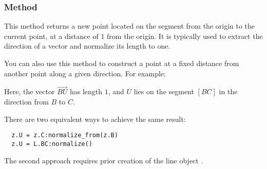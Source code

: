 \vspace{1em}


\begin{tkzexample}[latex = 7cm]
\begin{center}
\end{center}
\end{tkzexample}

\subsubsection{Method }
\label{ssub:method_normalize}

This method returns a new point located on the segment from the origin to the current point, at a distance of $1$ from the origin. It is typically used to extract the direction of a vector and normalize its length to one.

\medskip
\noindent
You can also use this method to construct a point at a fixed distance from another point along a given direction. For example:

\begin{center}
\end{center}

\noindent
Here, the vector $\overrightarrow{BU}$ has length $1$, and $U$ lies on the segment $[BC]$ in the direction from $B$ to $C$.

\medskip
\noindent
There are two equivalent ways to achieve the same result:

\begin{mybox}
\begin{verbatim}
  z.U = z.C:normalize_from(z.B)
  z.U = L.BC:normalize()
\end{verbatim}
\end{mybox}

\noindent
The second approach requires prior creation of the line object .

\vspace{1em}

\begin{tkzexample}[latex=8cm]
\end{tkzexample}

